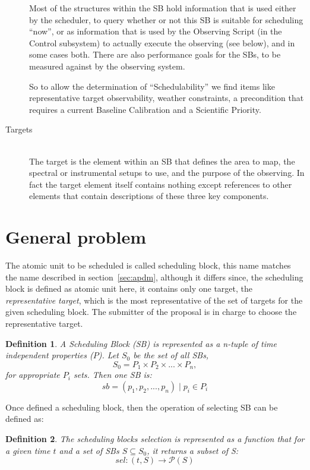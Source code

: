 \begin{description}
Most of the structures within the SB hold information that is used either by the scheduler, to query whether or not this SB is suitable for scheduling ``now'', or as information that is used by the Observing Script (in the Control subsystem) to actually execute the observing (see below), and in some cases both. There are also performance goals for the SBs, to be measured against by the observing system.

So to allow the determination of ``Schedulability'' we find items like representative target observability, weather constraints, a precondition that requires a current Baseline Calibration and a Scientific Priority.

\item[Targets] \hfill \\
The target is the element within an SB that defines the area to map, the spectral or instrumental setups to use, and the purpose of the observing. In fact the target element itself contains nothing except references to other elements that contain descriptions of these three key components.

\end{description}

\section{General problem}
\newtheorem{problem-def}{Definition}
The atomic unit to be scheduled is called scheduling block, this name matches the name described in section~\ref{sec:apdm}, although it differs since, the scheduling block is defined as atomic unit here, it contains only one target, the \textit{representative target}, which is the most representative of the set of targets for the given scheduling block. The submitter of the proposal is in charge to choose the representative target.


\begin{problem-def}
A Scheduling Block (SB) is represented as a n-tuple of time independent  properties ($P$). Let $S_0$ be the set of all SBs,
$$S_0 = P_1 \times P_2 \times ... \times P_n,$$
for appropriate $P_i$ sets. Then one SB is:
$$sb = (p_1, p_2, ..., p_n) \mid p_i \in P_i$$
\end{problem-def} 

Once defined a scheduling block, then the operation of selecting SB can be defined as:
\begin{problem-def}
The scheduling blocks selection is represented as a function that for a given time $t$ and a set of SBs $S \subseteq S_0$, it returns a subset of S:
$$sel:(t,S) \rightarrow \mathcal P \left({S}\right)$$
\end{problem-def}

